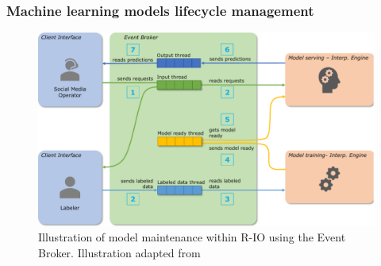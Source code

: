 \subsubsection{Machine learning models lifecycle management}
\begin{figure}[htb]
    \centering
    \includegraphics[width=\textwidth]{figures/chap-5/rio-ml-lifecycle.pdf}
    \caption{Illustration of model maintenance within R-IO using the Event Broker. Illustration adapted from \textcite{burkovMachineLearningEngineering2020}}
    \label{system:rio-broker-ml-lifecycle}
\end{figure}

